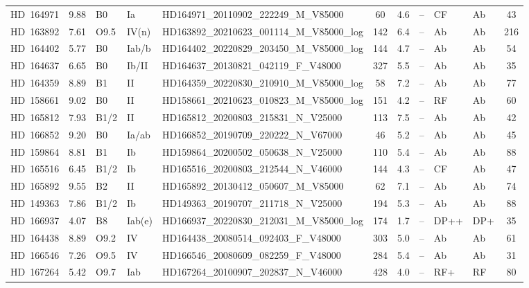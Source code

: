 {\begin{landscape}
\begin{longtable}{lclllcclllc}
\noalign{\smallskip}
HD~164971 & 9.88 & B0 & Ia & HD164971\_20110902\_222249\_M\_V85000 & 60 & 4.6 & -- & CF & Ab & 43 \\
\noalign{\smallskip}
HD~163892 & 7.61 & O9.5 & IV(n) & HD163892\_20210623\_001114\_M\_V85000\_log & 142 & 6.4 & -- & Ab & Ab & 216 \\
\noalign{\smallskip}
HD~164402 & 5.77 & B0 & Iab/b & HD164402\_20220829\_203450\_M\_V85000\_log & 144 & 4.7 & -- & Ab & Ab & 54 \\
\noalign{\smallskip}
HD~164637 & 6.65 & B0 & Ib/II & HD164637\_20130821\_042119\_F\_V48000 & 327 & 5.5 & -- & Ab & Ab & 35 \\
\noalign{\smallskip}
HD~164359 & 8.89 & B1 & II & HD164359\_20220830\_210910\_M\_V85000\_log & 58 & 7.2 & -- & Ab & Ab & 77 \\
\noalign{\smallskip}
HD~158661 & 9.02 & B0 & II & HD158661\_20210623\_010823\_M\_V85000\_log & 151 & 4.2 & -- & RF & Ab & 60 \\
\noalign{\smallskip}
HD~165812 & 7.93 & B1/2 & II & HD165812\_20200803\_215831\_N\_V25000 & 113 & 7.5 & -- & Ab & Ab & 42 \\
\noalign{\smallskip}
HD~166852 & 9.20 & B0 & Ia/ab & HD166852\_20190709\_220222\_N\_V67000 & 46 & 5.2 & -- & Ab & Ab & 45 \\
\noalign{\smallskip}
HD~159864 & 8.81 & B1 & Ib & HD159864\_20200502\_050638\_N\_V25000 & 110 & 5.4 & -- & Ab & Ab & 88 \\
\noalign{\smallskip}
HD~165516 & 6.45 & B1/2 & Ib & HD165516\_20200803\_212544\_N\_V46000 & 144 & 4.3 & -- & CF & Ab & 47 \\
\noalign{\smallskip}
HD~165892 & 9.55 & B2 & II & HD165892\_20130412\_050607\_M\_V85000 & 62 & 7.1 & -- & Ab & Ab & 74 \\
\noalign{\smallskip}
HD~149363 & 7.86 & B1/2 & Ib & HD149363\_20190707\_211718\_N\_V25000 & 194 & 5.3 & -- & Ab & Ab & 88 \\
\noalign{\smallskip}
HD~166937 & 4.07 & B8 & Iab(e) & HD166937\_20220830\_212031\_M\_V85000\_log & 174 & 1.7 & -- & DP++ & DP+ & 35 \\
\noalign{\smallskip}
HD~164438 & 8.89 & O9.2 & IV & HD164438\_20080514\_092403\_F\_V48000 & 303 & 5.0 & -- & Ab & Ab & 61 \\
\noalign{\smallskip}
HD~166546 & 7.26 & O9.5 & IV & HD166546\_20080609\_082259\_F\_V48000 & 284 & 5.4 & -- & Ab & Ab & 31 \\
\noalign{\smallskip}
HD~167264 & 5.42 & O9.7 & Iab & HD167264\_20100907\_202837\_N\_V46000 & 428 & 4.0 & -- & RF+ & RF & 80 \\

\end{longtable}
\end{landscape}}
